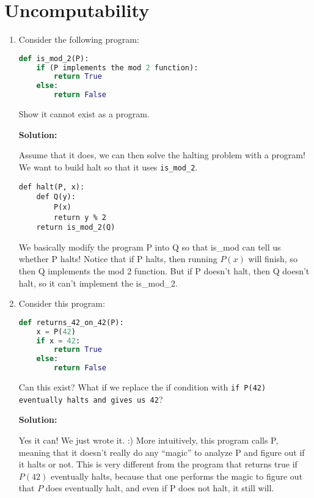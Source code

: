 \documentclass{article}
\newenvironment{solution}{

        \color{blue} \smallskip \textbf{Solution:}

    }{}
\begin{document}
\section{Uncomputability}
\begin{enumerate}
    \item Consider the following program: 
    \begin{lstlisting}[language=Python] 
def is_mod_2(P):
    if (P implements the mod 2 function):
        return True 
    else:
        return False
    \end{lstlisting}
    Show it cannot exist as a program.
    \begin{solution}
    Assume that it does, we can then solve the halting problem with a program! We want to build halt so that it uses \texttt{is\_mod\_2}.
    
\begin{lstlisting}
def halt(P, x):
    def Q(y):
        P(x)
        return y % 2
    return is_mod_2(Q)
\end{lstlisting}

    We basically modify the program P into Q so that is\_mod can tell us whether P halts! Notice that if P halts, then running $P(x)$ will finish,
    so then Q implements the mod 2 function. But if P doesn't halt, then Q doesn't halt, so it can't implement the is\_mod\_2.

    \end{solution}
    \item Consider this program:
    \begin{lstlisting}[language=Python]
def returns_42_on_42(P):
    x = P(42)
    if x = 42:
        return True
    else:
        return False
    \end{lstlisting}
    Can this exist? What if we replace the if condition with \texttt{if P(42) eventually halts and gives us 42}?
    \begin{solution}
    Yes it can! We just wrote it. :) 
    More intuitively, this program calls P, meaning that it doesn't really do any ``magic'' to analyze P and figure out if
    it halts or not. This is very different from the program that returns true if $P(42)$ eventually halts, because that one
    performs the magic to figure out that $P$ does eventually halt, and even if P does not halt, it still will.
    \end{solution}
\end{enumerate}
\end{document}
